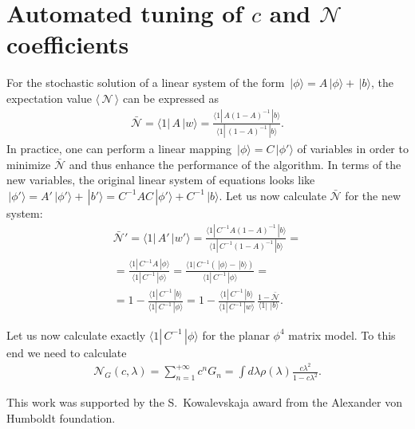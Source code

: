 \documentclass[twocolumn,showpacs,preprintnumbers,superscriptaddress,amsmath,floatfix,amssymb,secnumarabic]{revtex4}
\newcommand{\lr}[1]{ \left( #1 \right) }
\newcommand{\vev}[1]{ \langle \, #1 \, \rangle }
\newcommand{\ket}[1]{ \, | #1 \rangle }
\newcommand{\bra}[1]{ \langle #1 | \, }
\begin{document}
\section{Automated tuning of $c$ and $\mathcal{N}$ coefficients}

 For the stochastic solution of a linear system of the form $\ket{\phi} = A \ket{\phi} + \ket{b}$, the expectation value $\vev{\mathcal{N}}$ can be expressed as
\begin{eqnarray}
\label{mean_nA}
 \bar{\mathcal{N}} = \bra{1} A \ket{w} = \frac{\bra{1} A \lr{1 - A}^{-1} \ket{b}}{\bra{1} \lr{1 - A}^{-1} \ket{b}} .
\end{eqnarray}
In practice, one can perform a linear mapping $\ket{\phi} = C \ket{\phi'}$ of variables in order to minimize $\bar{\mathcal{N}}$ and thus enhance the performance of the algorithm. In terms of the new variables, the original linear system of equations looks like $\ket{\phi'} = A' \ket{\phi'} + \ket{b'} = C^{-1} A C \ket{\phi'} + C^{-1} \ket{b}$. Let us now calculate $\bar{\mathcal{N}}$ for the new system:
\begin{eqnarray}
\label{mean_nA_new}
 \bar{\mathcal{N}}' = \bra{1} A' \ket{w'} 
 = 
 \frac{\bra{1} C^{-1} A \lr{1 - A}^{-1} \ket{b}}{\bra{1} C^{-1} \lr{1 - A}^{-1} \ket{b}}
 = \nonumber \\ =
 \frac{\bra{1} C^{-1} A \ket{\phi}}{\bra{1} C^{-1} \ket{\phi}}
 = 
 \frac{\bra{1} C^{-1} \lr{\ket{\phi} - \ket{b}} }{\bra{1} C^{-1} \ket{\phi}}
 = \nonumber \\ =
 1 - \frac{\bra{1} C^{-1} \ket{b}}{\bra{1} C^{-1} \ket{\phi}} 
 =
 1 - \frac{\bra{1} C^{-1} \ket{b}}{\bra{1} C^{-1} \ket{w}} \, \frac{1 - \bar{\mathcal{N}}}{\bra{1}\ket{b}}.
\end{eqnarray}

 Let us now calculate exactly $\bra{1} C^{-1} \ket{\phi}$ for the planar $\phi^4$ matrix model. To this end we need to calculate
\begin{eqnarray}
\label{Gnorm_rescaled}
 \mathcal{N}_G\lr{c, \lambda} = \sum\limits_{n = 1}^{+\infty} c^n G_n =
 \int d\lambda \rho\lr{\lambda} \frac{c \lambda^2}{1 - c \lambda^2} .
\end{eqnarray}

\begin{acknowledgments}
 This work was supported by the S.~Kowalevskaja award from the Alexander von Humboldt foundation.
\end{acknowledgments}



\end{document}
